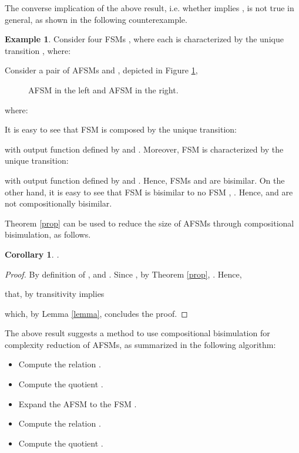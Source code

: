\documentclass{amsart}
\newtheorem{corollary}[theorem]{Corollary}
\theoremstyle{definition}
\newtheorem{example}[theorem]{Example}
\theoremstyle{remark}
\numberwithin{equation}{section}
\begin{document}
The converse implication of the above result, i.e. whether  implies , is not true in general, as shown in the following counterexample. 
\begin{example}
Consider four FSMs  , where each  is characterized by the unique transition , where:

Consider a pair of AFSMs  and , depicted in Figure \ref{figcounterexample}, 
\begin{figure}[t]
\centering
{}
\caption[]{AFSM  in the left and AFSM  in the right.}
\label{figcounterexample}
\end{figure}
where:

It is easy to see that FSM  is composed by the unique transition:

with output function  defined by  and . Moreover, FSM  is characterized by the unique transition:

with output function  defined by  and . Hence, FSMs  and  are bisimilar. On the other hand, it is easy to see that FSM  is bisimilar to no FSM , . Hence,  and  are not compositionally bisimilar.
\end{example}


Theorem \ref{prop} can be used to reduce the size of AFSMs through compositional bisimulation, as follows. 
\begin{corollary}
\label{coro}
.
\end{corollary}
\begin{proof}
By definition of ,  and . Since , by Theorem \ref{prop}, .  
Hence,

that, by transitivity implies 
 
which, by Lemma \ref{lemma}, concludes the proof.
\end{proof}

The above result suggests a method to use compositional bisimulation for complexity reduction of AFSMs, as summarized in the following algorithm:
\begin{itemize}
\item Compute the relation .
\item Compute the quotient .
\item Expand the AFSM  to the FSM .
\item Compute the relation .
\item Compute the quotient . \end{itemize}
\end{document}
